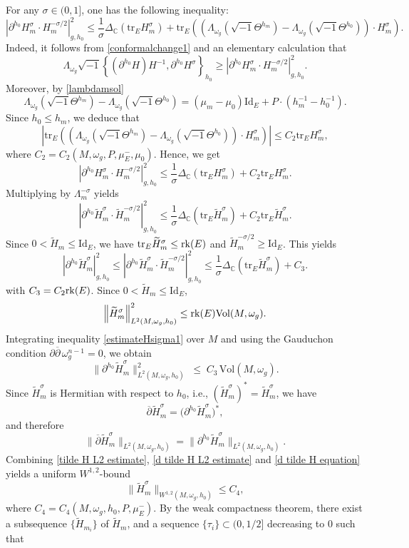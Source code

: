 \documentclass[12pt, reqno]{amsart}
\newcommand{\id}{{\rm id}}
\newcommand{\rk}{{\rm rk}}
\theoremstyle{plain}
\theoremstyle{definition}
\newcommand{\sq}{\sqrt{-1}}
\newcommand{\p}{\partial}
\renewcommand{\bar}{\overline}
\newcommand{\beq}{\begin{equation}}
\newcommand{\eeq}{\end{equation}}
\renewcommand{\tilde}{\widetilde}
\renewcommand{\>}{\rightarrow}
\newcommand{\C}{{\mathbb C}}
\renewcommand{\>}{\rightarrow}
\renewcommand{\p}{{\partial}}
\newcommand{\om}{\omega}
\renewcommand{\bar}{\overline}
\renewcommand{\tilde}{\widetilde}
\renewcommand{\id}{\mathrm{Id}}
\newcommand{\tr}{\mathrm{tr}}
\numberwithin{equation}{section} %
\begin{document}
For any $\sigma\in (0,1]$, one has the following inequality: \beq
\left| \p^{h_0}H_m^\sigma\cdot H_m^{-\sigma/2} \right|_{g,h_0}^2
\leq  \frac{1}{\sigma}\Delta_\C\left(\tr_E H_m^\sigma\right)
+\tr_E\left(\left(\Lambda_{\om_g}
\left(\sq\Theta^{h_m}\right)-\Lambda_{\om_g}\left(\sq
\Theta^{h_0}\right)\right)\cdot H_m^\sigma\right). \label{estimateA}
\eeq Indeed, it follows from \eqref{conformalchange1} and an
elementary calculation that \beq
\Lambda_{\om_g}\sq\left\{(\p^{h_0}H)H^{-1},\p^{h_0}H^\sigma\right\}_{h_0}\geq
\left| \p^{h_0}H_m^\sigma\cdot H_m^{-\sigma/2}
\right|_{g,h_0}^2.\eeq Moreover, by \eqref{lambdamsol} \beq
\Lambda_{\om_g}
\left(\sq\Theta^{h_m}\right)-\Lambda_{\om_g}\left(\sq
\Theta^{h_0}\right)=(\mu_m-\mu_0) \mathrm{Id}_E+P\cdot
(h_m^{-1}-h_0^{-1}). \eeq Since $h_0\leq h_m$, we deduce that
\beq\left|\tr_E\left(\left(\Lambda_{\om_g}
\left(\sq\Theta^{h_m}\right)-\Lambda_{\om_g}\left(\sq
\Theta^{h_0}\right)\right)\cdot H_m^\sigma\right)\right|\leq
C_2\tr_EH_m^\sigma, \eeq where $C_2=C_2(M, \omega_g, P,\mu_E^-,
\mu_0)$.
Hence, we get
\beq \left|\p^{h_0}H_m^\sigma \cdot H_m^{-\sigma/2}\right|_{g,h_0}^2
\leq  \frac{1}{\sigma}\Delta_\C\left(\tr_E H_m^\sigma\right)
+C_2\tr_E H_m^\sigma. \eeq Multiplying by $\Lambda_m^{-\sigma}$
yields \beq \left|\p^{h_0}\tilde H_m^\sigma \cdot \tilde
H_m^{-\sigma/2}\right|_{g,h_0}^2 \leq
\frac{1}{\sigma}\Delta_\C\left(\tr_E \tilde H_m^\sigma\right)
+C_2\tr_E \tilde H_m^\sigma. \label{estimateHsigma} \eeq Since
$0<\tilde H_m\leq\id_E$, we have $\tr_E\tilde H_m^\sigma\leq\rk(E)$
and $\tilde H_m^{-\sigma/2}\geq\id_E$. This yields \beq
\left|\p^{h_0} \tilde H_m^\sigma \right|_{g,h_0}^2 \leq
\left|\p^{h_0}\tilde H_m^\sigma \cdot \tilde
H_m^{-\sigma/2}\right|_{g,h_0}^2 \leq
\frac{1}{\sigma}\Delta_\C\left(\tr_E \tilde H_m^\sigma\right) +C_3.
\label{estimateHsigma1} \eeq  with $C_3=C_2\rk(E)$. Since $0<\tilde
H_m\leq\id_E$, \beq \left\| \tilde H_m^\sigma
\right\|_{L^2(M,\omega_g,h_0)}^2 \leq \rk(E)\mathrm{Vol}(M,\om_g).
\label{tilde H L2 estimate} \eeq Integrating inequality
\eqref{estimateHsigma1} over $M$ and using the Gauduchon condition
$\partial\bar{\partial}\,\omega_g^{n-1}=0$, we obtain
\begin{equation}
\label{d tilde H L2 estimate} \bigl\|\partial^{h_0}\tilde
H_m^\sigma\bigr\|_{L^2(M,\omega_g,h_0)}^2 \;\le\;
C_3\,\mathrm{Vol}(M,\omega_g).
\end{equation}
Since $\tilde H_m^\sigma$ is Hermitian with respect to $h_0$, i.e.,
$(\tilde H_m^\sigma)^*=\tilde H_m^\sigma$, we have
\[
\bar{\partial}\tilde H_m^\sigma = \bigl(\partial^{h_0}\tilde
H_m^\sigma\bigr)^*,
\]
and therefore
\begin{equation}
\label{d tilde H equation} \bigl\|\bar{\partial}\tilde
H_m^\sigma\bigr\|_{L^2(M,\omega_g,h_0)} =
\bigl\|\partial^{h_0}\tilde H_m^\sigma\bigr\|_{L^2(M,\omega_g,h_0)}.
\end{equation}
Combining \eqref{tilde H L2 estimate}, \eqref{d tilde H L2 estimate}
and \eqref{d tilde H equation} yields a uniform $W^{1,2}$-bound \beq
\|\tilde H_m^\sigma\|_{W^{1,2}(M,\omega_g,h_0)} \le C_4, \eeq where
$C_4=C_4(M,\omega_g,h_0, P, \mu_E^-)$. By the weak compactness
theorem, there exist a subsequence $\{\tilde H_{m_i}\}$ of $\tilde
H_m$,  and a sequence $\{\tau_i\}\subset  (0,1/2]$ decreasing to $0$
such that
\end{document}
